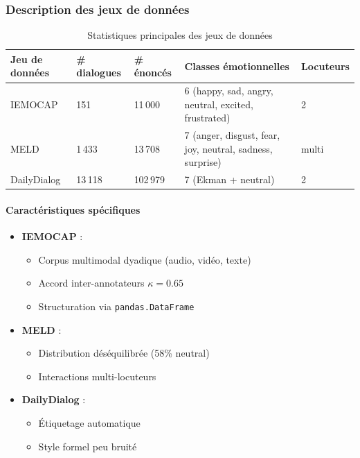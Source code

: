 \documentclass[a4paper,11pt]{article}
\begin{document}
\subsubsection{Description des jeux de données}

\begin{table}[h]
  \centering
  \begin{tabular}{lllll}
    \toprule
    Jeu de données & \# dialogues & \# énoncés & Classes émotionnelles & Locuteurs \\
    \midrule
    IEMOCAP & 151 & 11\,000 & 6 (happy, sad, angry, neutral, excited, frustrated) & 2 \\
    MELD & 1\,433 & 13\,708 & 7 (anger, disgust, fear, joy, neutral, sadness, surprise) & multi \\
    DailyDialog & 13\,118 & 102\,979 & 7 (Ekman + neutral) & 2 \\
    \bottomrule
  \end{tabular}
  \caption{Statistiques principales des jeux de données \cite{busso2008iemocap, poria2019meld, li2017dailydialog}}
  \label{tab:dataset_stats}
\end{table}

\paragraph{Caractéristiques spécifiques}
\begin{itemize}
  \item \textbf{IEMOCAP} :
    \begin{itemize}
      \item Corpus multimodal dyadique (audio, vidéo, texte)
      \item Accord inter-annotateurs $\kappa=0.65$
      \item Structuration via \texttt{pandas.DataFrame}
    \end{itemize}
  
  \item \textbf{MELD} :
    \begin{itemize}
      \item Distribution déséquilibrée (58\% neutral)
      \item Interactions multi-locuteurs
    \end{itemize}
  
  \item \textbf{DailyDialog} :
    \begin{itemize}
      \item Étiquetage automatique
      \item Style formel peu bruité
    \end{itemize}
\end{itemize}
\end{document}
